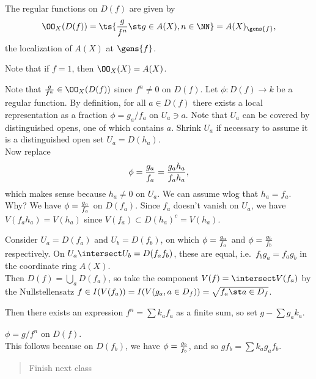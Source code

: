 \begin{proposition}[?]

The regular functions on \(D(f)\) are given by
\begin{align*}  
\OO_X(D(f)) = \ts{{ g \over f^n} \st g\in A(X), n\in \NN} = A(X)_{\gens{f}}
,\end{align*} the localization of \(A(X)\) at \(\gens{f}\).

\end{proposition}

Note that if \(f=1\), then \(\OO_X(X) = A(X)\).

\begin{proposition}[?]

Note that \({g\over f^n} \in \OO_X(D(f))\) since \(f^n\neq 0\) on
\(D(f)\). Let \(\phi: D(f) \to k\) be a regular function. By definition,
for all \(a\in D(f)\) there exists a local representation as a fraction
\(\phi = g_a/f_a\) on \(U_a\ni a\). Note that \(U_a\) can be covered by
distinguished opens, one of which contains \(a\). Shrink \(U_a\) if
necessary to assume it is a distinguished open set \(U_a = D(h_a)\).\\

Now replace
\begin{align*}  
\phi = {g_a \over f_a} = {g_a h_a \over f_a h_a}
,\end{align*} which makes sense because \(h_a\neq 0\) on \(U_a\). We can
assume wlog that \(h_a = f_a\). Why? We have \(\phi = {g_a \over f_a}\)
on \(D(f_a)\). Since \(f_a\) doesn't vanish on \(U_a\), we have
\(V(f_a h_a) = V(h_a)\) since \(V(f_a) \subset D(h_a)^c = V(h_a)\).

Consider \(U_a = D(f_a)\) and \(U_b = D(f_b)\), on which
\(\phi = {g_a\over f_a}\) and \(\phi = {g_b \over f_b}\) respectively.
On \(U_a\intersect U_b = D(f_a f_b)\), these are equal,
i.e.~\(f_b g_a = f_a g_b\) in the coordinate ring \(A(X)\).\\

Then \(D(f) = \bigcup_a D(f_a)\), so take the component
\(V(f) = \intersect V(f_a)\) by the Nullstellensatz
\(f\in I(V(f_a)) = I(V(g_a, a\in D_f)) = \sqrt{f_a \st a\in D_f}\).

Then there exists an expression \(f^n = \sum k_a f_a\) as a finite sum,
so set \(g - \sum g_a k_a\).

\begin{claim}

\(\phi = g/f^n\) on \(D(f)\).\\

This follows because on \(D(f_b)\), we have \(\phi = {g_b \over f_b}\),
and so \(gf_b = \sum k_a g_a f_b\).

\end{claim}

\begin{quote}
Finish next class
\end{quote}

\end{proposition}

